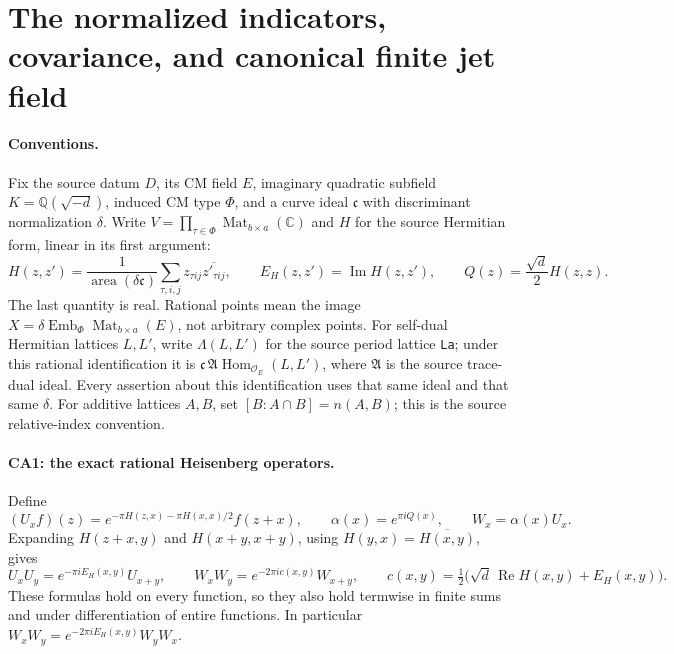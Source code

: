 \section{The normalized indicators, covariance, and canonical finite jet field}
\label{sec:canonical-analytic}


\paragraph{Conventions.}
Fix the source datum $D$, its CM field $E$, imaginary quadratic subfield
$K=\mathbb Q(\sqrt{-d})$, induced CM type $\Phi$, and a curve ideal
$\mathfrak c$ with discriminant normalization $\delta$. Write
$V=\prod_{\tau\in\Phi}\operatorname{Mat}_{b\times a}(\mathbb C)$ and
$H$ for the source Hermitian form, linear in its first argument:
\[
 H(z,z')=\frac1{\operatorname{area}(\delta\mathfrak c)}
       \sum_{\tau,i,j}z_{\tau ij}\overline{z'_{\tau ij}},\qquad
 E_H(z,z')=\operatorname{Im}H(z,z'),\qquad
 Q(z)=\frac{\sqrt d}{2}H(z,z).
 \tag{CA.1}
\]
The last quantity is real. Rational points mean the image
$X=\delta\operatorname{Emb}_{\Phi}\operatorname{Mat}_{b\times a}(E)$,
not arbitrary complex points. For self-dual Hermitian lattices $L,L'$,
write $\Lambda(L,L')$ for the source period lattice \texttt{La}; under
this rational identification it is
$\mathfrak c\,\mathfrak A\operatorname{Hom}_{\mathcal O_E}(L,L')$,
where $\mathfrak A$ is the source trace-dual ideal. Every assertion about
this identification uses that same ideal and that same $\delta$.
For additive lattices $A,B$, set $[B:A\cap B]=n(A,B)$; this is the
source relative-index convention.

\paragraph{CA1: the exact rational Heisenberg operators.}
Define
\[
 (U_x f)(z)=e^{-\pi H(z,x)-\pi H(x,x)/2}f(z+x),\qquad
 \alpha(x)=e^{\pi iQ(x)},\qquad W_x=\alpha(x)U_x.
 \tag{CA.2}
\]
Expanding $H(z+x,y)$ and $H(x+y,x+y)$, using
$H(y,x)=\overline{H(x,y)}$, gives
\[
 U_xU_y=e^{-\pi iE_H(x,y)}U_{x+y},\qquad
 W_xW_y=e^{-2\pi i c(x,y)}W_{x+y},\qquad
 c(x,y)=\tfrac12\bigl(\sqrt d\,\operatorname{Re}H(x,y)
                         +E_H(x,y)\bigr).
 \tag{CA.3}
\]
These formulas hold on every function, so they also hold termwise in
finite sums and under differentiation of entire functions. In particular
$W_xW_y=e^{-2\pi iE_H(x,y)}W_yW_x$.

